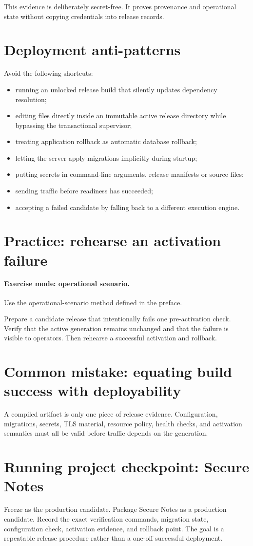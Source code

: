 This evidence is deliberately secret-free. It proves provenance and operational state without copying credentials into release records.

\section{Deployment anti-patterns}

Avoid the following shortcuts:

\begin{itemize}
  \item running an unlocked release build that silently updates dependency resolution;
  \item editing files directly inside an immutable active release directory while bypassing the transactional  supervisor;
  \item treating application rollback as automatic database rollback;
  \item letting the server apply migrations implicitly during startup;
  \item putting secrets in command-line arguments, release manifests or source files;
  \item sending traffic before readiness has succeeded;
  \item accepting a failed candidate by falling back to a different execution engine.
\end{itemize}

\section{Practice: rehearse an activation failure}
\paragraph{Exercise mode: operational scenario.} Use the operational-scenario method defined in the preface.

Prepare a candidate release that intentionally fails one pre-activation check. Verify that the active generation remains unchanged and that the failure is visible to operators. Then rehearse a successful activation and rollback.

\section{Common mistake: equating build success with deployability}
A compiled artifact is only one piece of release evidence. Configuration, migrations, secrets, TLS material, resource policy, health checks, and activation semantics must all be valid before traffic depends on the generation.

\section{Running project checkpoint: Secure Notes}
Freeze  as the production candidate. Package Secure Notes as a production candidate. Record the exact verification commands, migration state, configuration check, activation evidence, and rollback point. The goal is a repeatable release procedure rather than a one-off successful deployment.
